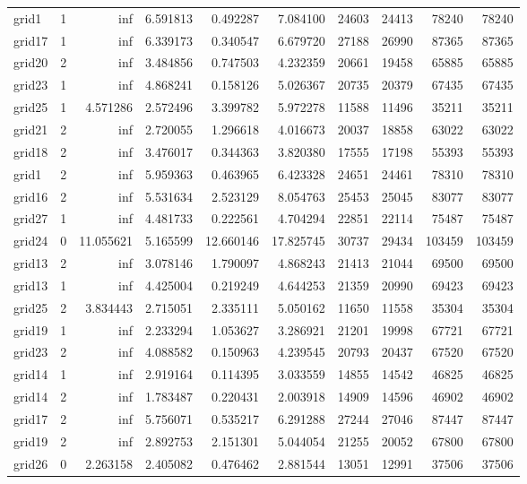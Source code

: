 \begin{longtable}{|l|r|r|r|r|r|r|r|r|r|}
grid1 & 1 & inf & 6.591813 & 0.492287 & 7.084100 & 24603 & 24413 & 78240 & 78240 \\
grid17 & 1 & inf & 6.339173 & 0.340547 & 6.679720 & 27188 & 26990 & 87365 & 87365 \\
grid20 & 2 & inf & 3.484856 & 0.747503 & 4.232359 & 20661 & 19458 & 65885 & 65885 \\
grid23 & 1 & inf & 4.868241 & 0.158126 & 5.026367 & 20735 & 20379 & 67435 & 67435 \\
grid25 & 1 & 4.571286 & 2.572496 & 3.399782 & 5.972278 & 11588 & 11496 & 35211 & 35211 \\
grid21 & 2 & inf & 2.720055 & 1.296618 & 4.016673 & 20037 & 18858 & 63022 & 63022 \\
grid18 & 2 & inf & 3.476017 & 0.344363 & 3.820380 & 17555 & 17198 & 55393 & 55393 \\
grid1 & 2 & inf & 5.959363 & 0.463965 & 6.423328 & 24651 & 24461 & 78310 & 78310 \\
grid16 & 2 & inf & 5.531634 & 2.523129 & 8.054763 & 25453 & 25045 & 83077 & 83077 \\
grid27 & 1 & inf & 4.481733 & 0.222561 & 4.704294 & 22851 & 22114 & 75487 & 75487 \\
grid24 & 0 & 11.055621 & 5.165599 & 12.660146 & 17.825745 & 30737 & 29434 & 103459 & 103459 \\
grid13 & 2 & inf & 3.078146 & 1.790097 & 4.868243 & 21413 & 21044 & 69500 & 69500 \\
grid13 & 1 & inf & 4.425004 & 0.219249 & 4.644253 & 21359 & 20990 & 69423 & 69423 \\
grid25 & 2 & 3.834443 & 2.715051 & 2.335111 & 5.050162 & 11650 & 11558 & 35304 & 35304 \\
grid19 & 1 & inf & 2.233294 & 1.053627 & 3.286921 & 21201 & 19998 & 67721 & 67721 \\
grid23 & 2 & inf & 4.088582 & 0.150963 & 4.239545 & 20793 & 20437 & 67520 & 67520 \\
grid14 & 1 & inf & 2.919164 & 0.114395 & 3.033559 & 14855 & 14542 & 46825 & 46825 \\
grid14 & 2 & inf & 1.783487 & 0.220431 & 2.003918 & 14909 & 14596 & 46902 & 46902 \\
grid17 & 2 & inf & 5.756071 & 0.535217 & 6.291288 & 27244 & 27046 & 87447 & 87447 \\
grid19 & 2 & inf & 2.892753 & 2.151301 & 5.044054 & 21255 & 20052 & 67800 & 67800 \\
grid26 & 0 & 2.263158 & 2.405082 & 0.476462 & 2.881544 & 13051 & 12991 & 37506 & 37506 \\

\end{longtable}
